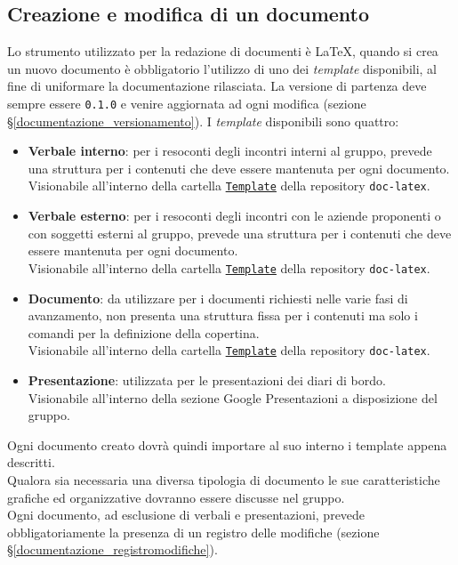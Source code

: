 \subsection{Creazione e modifica di un documento}
Lo strumento utilizzato per la redazione di documenti è LaTeX, quando si crea un nuovo documento è obbligatorio l'utilizzo di uno dei \textit{template} disponibili, al fine di uniformare la documentazione rilasciata.
La versione di partenza deve sempre essere \texttt{0.1.0} e venire aggiornata ad ogni modifica (sezione \S\ref{documentazione_versionamento}).
I \textit{template} disponibili sono quattro:
\begin{itemize}
    \item \textbf{Verbale interno}: per i resoconti degli incontri interni al gruppo, prevede una struttura per i contenuti che deve essere mantenuta per ogni documento.\\
    Visionabile all'interno della cartella \href{https://github.com/Project-SWEnergy/doc-latex/tree/main/Templates}{\texttt{Template}} della repository \texttt{doc-latex}.
    \item \textbf{Verbale esterno}: per i resoconti degli incontri con le aziende proponenti o con soggetti esterni al gruppo, prevede una struttura per i contenuti che deve essere mantenuta per ogni documento. \\
    Visionabile all'interno della cartella \href{https://github.com/Project-SWEnergy/doc-latex/tree/main/Templates}{\texttt{Template}} della repository \texttt{doc-latex}.
    \item \textbf{Documento}: da utilizzare per i documenti richiesti nelle varie fasi di avanzamento, non presenta una struttura fissa per i contenuti ma solo i comandi per la definizione della copertina.\\
    Visionabile all'interno della cartella \href{https://github.com/Project-SWEnergy/doc-latex/tree/main/Templates}{\texttt{Template}} della repository \texttt{doc-latex}.
    \item \textbf{Presentazione}: utilizzata per le presentazioni dei diari di bordo. \\
    Visionabile all'interno della sezione Google Presentazioni a disposizione del gruppo.
\end{itemize}
Ogni documento creato dovrà quindi importare al suo interno i template appena descritti. \\
Qualora sia necessaria una diversa tipologia di documento le sue caratteristiche grafiche ed organizzative dovranno essere discusse nel gruppo.\\
Ogni documento, ad esclusione di verbali e presentazioni, prevede obbligatoriamente la presenza di un registro delle modifiche (sezione \S\ref{documentazione_registromodifiche}).



